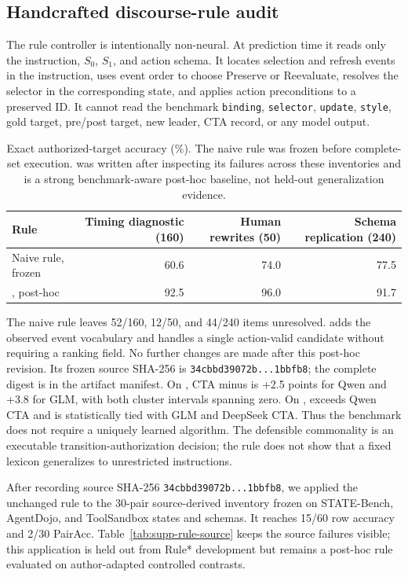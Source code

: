 \documentclass[10pt]{article}
\begin{document}
\subsection{Handcrafted discourse-rule audit}
The rule controller is intentionally non-neural. At prediction time it reads only the instruction,
$S_0$, $S_1$, and action schema. It locates selection and refresh events in the instruction,
uses event order to choose Preserve or Reevaluate, resolves the selector in the corresponding
state, and applies action preconditions to a preserved ID. It cannot read the benchmark
\texttt{binding}, \texttt{selector}, \texttt{update}, \texttt{style}, gold target, pre/post target,
new leader, CTA record, or any model output.

\begin{table}[H]
\centering
\small
\setlength{\tabcolsep}{4pt}
\begin{tabular}{lrrr}
\toprule
Rule & Timing diagnostic (160) & Human rewrites (50) & Schema replication (240)\\
\midrule
Naive rule, frozen & 60.6 & 74.0 & 77.5\\
\RuleStar{}, post-hoc & 92.5 & 96.0 & 91.7\\
\bottomrule
\end{tabular}
\caption{Exact authorized-target accuracy (\%). The naive rule was frozen before complete-set
execution. \RuleStar{} was written after inspecting its failures across these inventories and is a
strong benchmark-aware post-hoc baseline, not held-out generalization evidence.}
\label{tab:supp-rule}
\end{table}

The naive rule leaves 52/160, 12/50, and 44/240 items unresolved. \RuleStar{} adds the observed event
vocabulary and handles a single action-valid candidate without requiring a ranking field. No
further changes are made after this post-hoc revision. Its frozen source SHA-256 is
\texttt{34cbbd39072b...1bbfb8}; the complete digest is in the artifact manifest. On
\PrimaryDiagnostic{}, CTA minus \RuleStar{} is +2.5 points for Qwen and +3.8 for
GLM, with both cluster intervals spanning zero. On \NewSchemaReplication{}, \RuleStar{} exceeds Qwen CTA and is statistically
tied with GLM and DeepSeek CTA. Thus the benchmark does not require a uniquely learned algorithm.
The defensible commonality is an executable transition-authorization decision; the rule does not
show that a fixed lexicon generalizes to unrestricted instructions.

After recording source SHA-256 \texttt{34cbbd39072b...1bbfb8}, we applied the unchanged rule to
the 30-pair source-derived inventory frozen on STATE-Bench, AgentDojo, and ToolSandbox states and
schemas. It reaches 15/60 row accuracy and 2/30 PairAcc. Table~\ref{tab:supp-rule-source} keeps the
source failures visible; this application is held out from Rule* development but remains a
post-hoc rule evaluated on author-adapted controlled contrasts.
\end{document}
